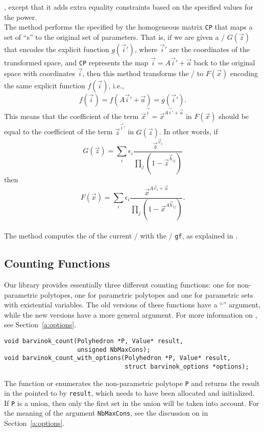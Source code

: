 , except that it adds extra
equality constraints based on the specified values for the power.
\\
The method  performs the
 specified by the homogeneous matrix \verb+CP+
that maps a set of ``s'' 
to the original set of parameters.
That is, if we are given a \rgf/ $G(\vec z)$ that encodes the
explicit function $g(\vec i')$, where $\vec i'$ are the coordinates of
the transformed space, and \verb+CP+ represents the map
$\vec i = A \vec i' + \vec a$ back to the original space with coordinates $\vec i$,
then this method transforms the \rgf/ to $F(\vec x)$ encoding the
same explicit function $f(\vec i)$, i.e., 
$$f(\vec i) = f(A \vec i' + \vec a) = g(\vec i ').$$
This means that the coefficient of the term 
$\vec x^{\vec i} = \vec x^{A \vec i' + \vec a}$ in $F(\vec x)$ should be equal to the
coefficient of the term $\vec z^{\vec i'}$ in $G(\vec z)$.
In other words, if
$$
G(\vec z) =
\sum_i \epsilon_i \frac{\vec z^{\vec v_i}}{\prod_j (1-\vec z^{\vec b_{ij}})}
$$
then
$$
F(\vec x) =
\sum_i \epsilon_i \frac{\vec x^{A \vec v_i + \vec a}}
                       {\prod_j (1-\vec x^{A \vec b_{ij}})}
.
$$
\\
The method  computes the
 of the current \rgf/ with the \rgf/ \verb+gf+,
as explained in .

\subsection{Counting Functions}
\label{a:counting:functions}

Our library provides essentially three different counting functions:
one for non-parametric polytopes, one for parametric polytopes
and one for parametric sets with existential variables.
The old versions of these functions have a ``''
argument, while the new versions have a more general
 argument.
For more information on , see Section~\ref{a:options}.

\begin{verbatim}
void barvinok_count(Polyhedron *P, Value* result, 
                    unsigned NbMaxCons);
void barvinok_count_with_options(Polyhedron *P, Value* result,
                                 struct barvinok_options *options);
\end{verbatim}
The function  or
 enumerates the non-parametric
polytope \verb+P+ and returns the result in the 
pointed to by \verb+result+, which needs to have been allocated
and initialized.
If \verb+P+ is a union, then only the first set in the union will
be taken into account.
For the meaning of the argument \verb+NbMaxCons+, see
the discussion on  in Section~\ref{a:options}.

